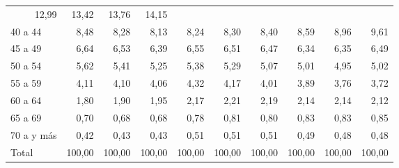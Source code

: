 \begin{tabular}{llllllllll}
  \multicolumn{1}{r}{12,99} &
  \multicolumn{1}{r}{13,42} &
  \multicolumn{1}{r}{13,76} &
  \multicolumn{1}{r}{14,15} \\
\multicolumn{1}{l}{\hspace{1em}40 a 44} &
  \multicolumn{1}{|r}{8,48} &
  \multicolumn{1}{r}{8,28} &
  \multicolumn{1}{r}{8,13} &
  \multicolumn{1}{r}{8,24} &
  \multicolumn{1}{r}{8,30} &
  \multicolumn{1}{r}{8,40} &
  \multicolumn{1}{r}{8,59} &
  \multicolumn{1}{r}{8,96} &
  \multicolumn{1}{r}{9,61} \\
\multicolumn{1}{l}{\hspace{1em}45 a 49} &
  \multicolumn{1}{|r}{6,64} &
  \multicolumn{1}{r}{6,53} &
  \multicolumn{1}{r}{6,39} &
  \multicolumn{1}{r}{6,55} &
  \multicolumn{1}{r}{6,51} &
  \multicolumn{1}{r}{6,47} &
  \multicolumn{1}{r}{6,34} &
  \multicolumn{1}{r}{6,35} &
  \multicolumn{1}{r}{6,49} \\
\multicolumn{1}{l}{\hspace{1em}50 a 54} &
  \multicolumn{1}{|r}{5,62} &
  \multicolumn{1}{r}{5,41} &
  \multicolumn{1}{r}{5,25} &
  \multicolumn{1}{r}{5,38} &
  \multicolumn{1}{r}{5,29} &
  \multicolumn{1}{r}{5,07} &
  \multicolumn{1}{r}{5,01} &
  \multicolumn{1}{r}{4,95} &
  \multicolumn{1}{r}{5,02} \\
\multicolumn{1}{l}{\hspace{1em}55 a 59} &
  \multicolumn{1}{|r}{4,11} &
  \multicolumn{1}{r}{4,10} &
  \multicolumn{1}{r}{4,06} &
  \multicolumn{1}{r}{4,32} &
  \multicolumn{1}{r}{4,17} &
  \multicolumn{1}{r}{4,01} &
  \multicolumn{1}{r}{3,89} &
  \multicolumn{1}{r}{3,76} &
  \multicolumn{1}{r}{3,72} \\
\multicolumn{1}{l}{\hspace{1em}60 a 64} &
  \multicolumn{1}{|r}{1,80} &
  \multicolumn{1}{r}{1,90} &
  \multicolumn{1}{r}{1,95} &
  \multicolumn{1}{r}{2,17} &
  \multicolumn{1}{r}{2,21} &
  \multicolumn{1}{r}{2,19} &
  \multicolumn{1}{r}{2,14} &
  \multicolumn{1}{r}{2,14} &
  \multicolumn{1}{r}{2,12} \\
\multicolumn{1}{l}{\hspace{1em}65 a 69} &
  \multicolumn{1}{|r}{0,70} &
  \multicolumn{1}{r}{0,68} &
  \multicolumn{1}{r}{0,68} &
  \multicolumn{1}{r}{0,78} &
  \multicolumn{1}{r}{0,81} &
  \multicolumn{1}{r}{0,80} &
  \multicolumn{1}{r}{0,83} &
  \multicolumn{1}{r}{0,83} &
  \multicolumn{1}{r}{0,85} \\
\multicolumn{1}{l}{\hspace{1em}70 a y más} &
  \multicolumn{1}{|r}{0,42} &
  \multicolumn{1}{r}{0,43} &
  \multicolumn{1}{r}{0,43} &
  \multicolumn{1}{r}{0,51} &
  \multicolumn{1}{r}{0,51} &
  \multicolumn{1}{r}{0,51} &
  \multicolumn{1}{r}{0,49} &
  \multicolumn{1}{r}{0,48} &
  \multicolumn{1}{r}{0,48} \\
\multicolumn{1}{l}{\hspace{1em}Total} &
  \multicolumn{1}{|r}{100,00} &
  \multicolumn{1}{r}{100,00} &
  \multicolumn{1}{r}{100,00} &
  \multicolumn{1}{r}{100,00} &
  \multicolumn{1}{r}{100,00} &
  \multicolumn{1}{r}{100,00} &
  \multicolumn{1}{r}{100,00} &
  \multicolumn{1}{r}{100,00} &
  \multicolumn{1}{r}{100,00} \\
\cline{1-10}
\end{tabular}
